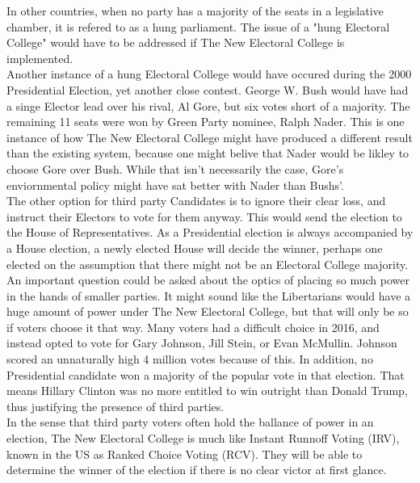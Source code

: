\documentclass{article}
\begin{document}
    In other countries, when no party has a majority of the seats in a legislative chamber, it is refered to as a hung parliament. The issue of a "hung Electoral College" would have to be addressed if The New Electoral College is implemented.\\
    
    Another instance of a hung Electoral College would have occured during the 2000 Presidential Election, yet another close contest. George W. Bush would have had a singe Elector lead over his rival, Al Gore, but six votes short of a majority. The remaining 11 seats were won by Green Party nominee, Ralph Nader. This is one instance of how The New Electoral College might have produced a different result than the existing system, because one might belive that Nader would be likley to choose Gore over Bush. While that isn't necessarily the case, Gore's enviornmental policy might have sat better with Nader than Bushs'.\\

    The other option for third party Candidates is to ignore their clear loss, and instruct their Electors to vote for them anyway. This would send the election to the House of Representatives. As a Presidential election is always accompanied by a House election, a newly elected House will decide the winner, perhaps one elected on the assumption that there might not be an Electoral College majority.\\

    An important question could be asked about the optics of placing so much power in the hands of smaller parties. It might sound like the Libertarians would have a huge amount of power under The New Electoral College, but that will only be so if voters choose it that way. Many voters had a difficult choice in 2016, and instead opted to vote for Gary Johnson, Jill Stein, or Evan McMullin. Johnson scored an unnaturally high 4 million votes because of this. In addition, no Presidential candidate won a majority of the popular vote in that election. That means Hillary Clinton was no more entitled to win outright than Donald Trump, thus justifying the presence of third parties.\\

    In the sense that third party voters often hold the ballance of power in an election, The New Electoral College is much like Instant Runnoff Voting (IRV), known in the US as Ranked Choice Voting (RCV). They will be able to determine the winner of the election if there is no clear victor at first glance.\\
\end{document}
